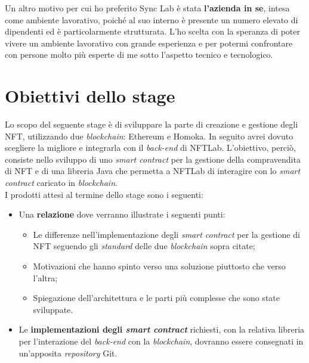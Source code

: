 Un altro motivo per cui ho preferito Sync Lab è stata \textbf{l'azienda in se}, intesa come ambiente lavorativo, poiché al suo interno è presente un numero elevato di dipendenti ed è particolarmente strutturata. L'ho scelta con la speranza di poter vivere un ambiente lavorativo con grande esperienza e per potermi confrontare con persone molto più esperte di me sotto l'aspetto tecnico e tecnologico.


\section{Obiettivi dello stage}
Lo scopo del seguente stage è di sviluppare la parte di creazione e gestione degli NFT, utilizzando due \emph{blockchain}: Ethereum e Homoka. In seguito avrei dovuto scegliere la migliore e integrarla con il \emph{back-end} di NFTLab. L'obiettivo, perciò, consiste nello sviluppo di uno \emph{smart contract} per la gestione della compravendita di NFT e di una libreria Java che permetta a NFTLab di interagire con lo \emph{smart contract} caricato in \emph{blockchain}. \\

\noindent I prodotti attesi al termine dello stage sono i seguenti:
\begin{itemize}
  \item Una \textbf{relazione} dove verranno illustrate i seguenti punti:
  \begin{itemize}
    \item Le differenze nell'implementazione degli \emph{smart contract} per la gestione di NFT seguendo gli \emph{standard} delle due \emph{blockchain} sopra citate;
    \item Motivazioni che hanno spinto verso una soluzione piuttosto che verso l'altra;
    \item Spiegazione dell'architettura e le parti più complesse che sono state sviluppate.
  \end{itemize}
  \item Le \textbf{implementazioni degli \emph{smart contract}} richiesti, con la relativa libreria per l'interazione del \emph{back-end} con la \emph{blockchain}, dovranno essere consegnati in un'apposita \emph{repository} Git.
\end{itemize}

